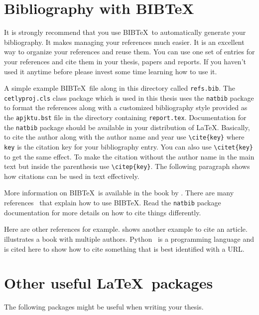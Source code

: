 \documentclass[BTech]{cetlyproj}
\begin{document}
\section{Bibliography with BIB\TeX}

It is strongly recommend that you use BIB\TeX\ to automatically generate
your bibliography.  It makes managing your references much easier.  It
is an excellent way to organize your references and reuse them.  You
can use one set of entries for your references and cite them in your
thesis, papers and reports.  If you haven't used it anytime before
please invest some time learning how to use it.  

A simple example BIB\TeX\ file along in this directory called \verb+refs.bib+. The \verb+cetlyproj.cls+ class package which
is used in this thesis uses the \verb+natbib+ package to format the references along with a customized bibliography style provided as the \verb+apjktu.bst+ file in the directory containing \verb+report.tex+.  Documentation for the \verb+natbib+ package should be available in your distribution of \LaTeX.  Basically, to cite the author along with the author name and year use \verb+\cite{key}+ where \verb+key+ is the citation key for your bibliography entry.  You can also use \verb+\citet{key}+ to get the same effect.  To make the citation without the author name in the main text but inside the parenthesis use \verb+\citep{key}+.  The following paragraph shows how citations can be used in text effectively.

More information on BIB\TeX\ is available in the book by
\cite{lamport:86}.  There are many references~\citep{lamport:86,latexcompanion} that explain how to use
BIB\TeX.  Read the \verb+natbib+ package documentation for more
details on how to cite things differently.

Here are other references for example.\citet{einstein:905} shows another example to cite an article.\citet{latexcompanion} illustrates a book with multiple authors.  Python~\citep{py:python} is a programming language and is
cited here to show how to cite something that is best identified with
a URL.

\section{Other useful \LaTeX\ packages}

The following packages might be useful when writing your thesis.
\end{document}
